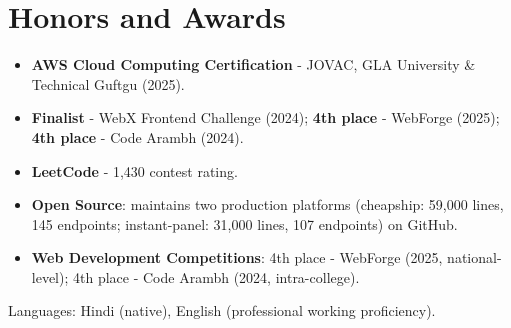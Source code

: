 \documentclass[11pt,a4paper,sans]{moderncv}
\begin{document}
\section{Honors and Awards}
\vspace{1pt}
\begin{itemize}
    \item {\textbf{AWS Cloud Computing Certification} - JOVAC, GLA University \& Technical Guftgu (2025).}
    \item {\textbf{Finalist} - WebX Frontend Challenge (2024); \textbf{4th place} - WebForge (2025); \textbf{4th place} - Code Arambh (2024).}
    \item {\textbf{LeetCode} - 1,430 contest rating.}
    \item {\textbf{Open Source}: maintains two production platforms (cheapship: 59,000 lines, 145 endpoints; instant-panel: 31,000 lines, 107 endpoints) on GitHub.}
    \item {\textbf{Web Development Competitions}: 4th place - WebForge (2025, national-level); 4th place - Code Arambh (2024, intra-college).}
\end{itemize}


\vspace{2pt}
\small{Languages: Hindi (native), English (professional working proficiency).}
\end{document}
